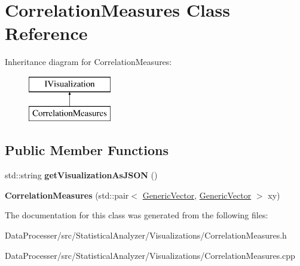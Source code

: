 \hypertarget{classCorrelationMeasures}{}\section{Correlation\+Measures Class Reference}
\label{classCorrelationMeasures}
Inheritance diagram for Correlation\+Measures\+:\begin{figure}[H]
\begin{center}
\leavevmode
\includegraphics[height=2.000000cm]{classCorrelationMeasures}
\end{center}
\end{figure}
\subsection*{Public Member Functions}
\begin{DoxyCompactItemize}
\item 
\mbox{\label{classCorrelationMeasures_ab51972b6029232bb8ddfa9f518ebd205}} 
std\+::string {\bfseries get\+Visualization\+As\+J\+S\+ON} ()
\item 
\mbox{\label{classCorrelationMeasures_aa9a5f39548be29db3fa7a7710691725b}} 
{\bfseries Correlation\+Measures} (std\+::pair$<$ \hyperlink{classGenericVector}{Generic\+Vector}, \hyperlink{classGenericVector}{Generic\+Vector} $>$ xy)
\end{DoxyCompactItemize}


The documentation for this class was generated from the following files\+:\begin{DoxyCompactItemize}
\item 
Data\+Processer/src/\+Statistical\+Analyzer/\+Visualizations/Correlation\+Measures.\+h\item 
Data\+Processer/src/\+Statistical\+Analyzer/\+Visualizations/Correlation\+Measures.\+cpp\end{DoxyCompactItemize}
